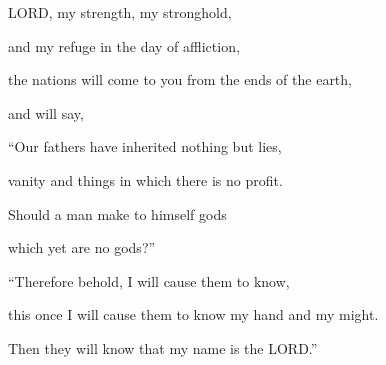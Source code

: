 \vspace{\baselineskip}

\myverse{}LORD, my strength, my stronghold,

and my refuge in the day of affliction,

the nations will come to you from the ends of the earth,

and will say,

“Our fathers have inherited nothing but lies,

vanity and things in which there is no profit.


\myverse{}Should a man make to himself gods

which yet are no gods?”

\vspace{\baselineskip}

\myverse{}“Therefore behold, I will cause them to know,

this once I will cause them to know my hand and my might.

Then they will know that my name is the LORD.”


